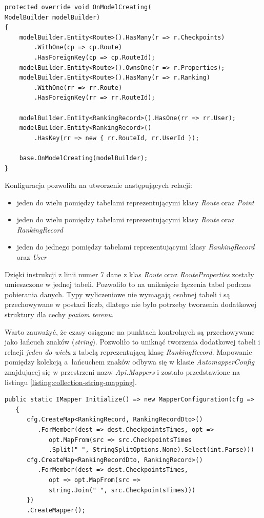 \begin{lstlisting}[caption={Konfiguracja mapowania relacyjno-obiektowego},label=listing:context]
protected override void OnModelCreating(
ModelBuilder modelBuilder)
{
    modelBuilder.Entity<Route>().HasMany(r => r.Checkpoints)
    	.WithOne(cp => cp.Route)
    	.HasForeignKey(cp => cp.RouteId);
    modelBuilder.Entity<Route>().OwnsOne(r => r.Properties);
    modelBuilder.Entity<Route>().HasMany(r => r.Ranking)
    	.WithOne(rr => rr.Route)
        .HasForeignKey(rr => rr.RouteId);

    modelBuilder.Entity<RankingRecord>().HasOne(rr => rr.User);
    modelBuilder.Entity<RankingRecord>()
    	.HasKey(rr => new { rr.RouteId, rr.UserId });

    base.OnModelCreating(modelBuilder);
}
\end{lstlisting}
Konfiguracja pozwoliła na utworzenie następujących relacji:
\begin{itemize}
\item{jeden do wielu pomiędzy tabelami reprezentującymi klasy \textit{Route}} oraz \textit{Point}
\item{jeden do wielu pomiędzy tabelami reprezentującymi klasy \textit{Route}} oraz \textit{RankingRecord}
\item{jeden do jednego pomiędzy tabelami reprezentującymi klasy \textit{RankingRecord} oraz \textit{User}}
\end{itemize}
Dzięki instrukcji z linii numer 7 dane z klas \textit{Route} oraz \textit{RouteProperties} zostały umieszczone w jednej tabeli. Pozwoliło to na uniknięcie łączenia tabel podczas pobierania danych. Typy wyliczeniowe nie wymagają osobnej tabeli i są przechowywane w postaci liczb, dlatego nie było potrzeby tworzenia dodatkowej struktury dla cechy \textit{poziom terenu}.

Warto zauważyć, że czasy osiągane na punktach kontrolnych są przechowywane jako łańcuch znaków (\textit{string}). Pozwoliło to uniknąć tworzenia dodatkowej tabeli i relacji \textit{jeden do wielu} z tabelą reprezentującą klasę \textit{RankingRecord}. Mapowanie pomiędzy kolekcją a~łańcuchem znaków odbywa się w klasie \textit{AutomapperConfig} znajdującej się w przestrzeni nazw \textit{Api.Mappers} i zostało przedstawione na listingu \ref{listing:collection-string-mapping}.
\begin{lstlisting}[caption={Mapowanie pomiedzy kolekcją a łańcuchem znaków},label=listing:collection-string-mapping]
public static IMapper Initialize() => new MapperConfiguration(cfg =>
   {
      cfg.CreateMap<RankingRecord, RankingRecordDto>()
         .ForMember(dest => dest.CheckpointsTimes, opt =>
            opt.MapFrom(src => src.CheckpointsTimes
            .Split(" ", StringSplitOptions.None).Select(int.Parse)))
      cfg.CreateMap<RankingRecordDto, RankingRecord>()
         .ForMember(dest => dest.CheckpointsTimes,
            opt => opt.MapFrom(src => 
            string.Join(" ", src.CheckpointsTimes)))
      })
      .CreateMapper();
\end{lstlisting}

